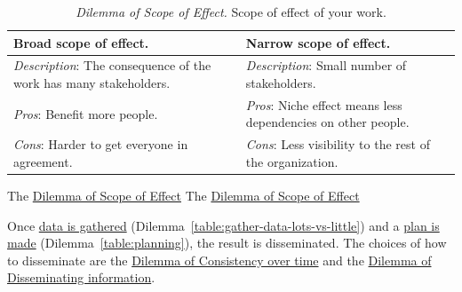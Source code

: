 \begin{center}
\begin{table}[H] %
\begin{tabular}{ | m{\dilemmatablewidth}| m{\dilemmatablewidth} | } 
  \hline
  \textbf{Broad scope of effect.} &
  \textbf{Narrow scope of effect.} \\
  \hline
  \textit{Description}: The consequence of the work has many stakeholders. &
  \textit{Description}: Small number of stakeholders. \\  
  \hline
  \textit{Pros}: Benefit more people. &
  \textit{Pros}: Niche effect means less dependencies on other people. \\
  \hline
  \textit{Cons}: Harder to get everyone in agreement. & 
  \textit{Cons}: Less visibility to the rest of the organization. \\
  \hline
\end{tabular}
\caption{
\textit{Dilemma of Scope of Effect.}
Scope of effect of your work. 
}
\end{table}
\label{table:scope-broad-vs-narrow}
\end{center}

The \href{table:scope-broad-vs-narrow}{Dilemma of Scope of Effect}
The \href{table:scope-broad-vs-narrow}{Dilemma of Scope of Effect}


Once \hyperref[table:gather-data-lots-vs-little]{data is gathered} (Dilemma~\ref{table:gather-data-lots-vs-little}) and a \hyperref[table:planning]{plan is made} (Dilemma~\ref{table:planning}), the result is disseminated. The choices of how to disseminate are the \hyperref[table:consistency]{Dilemma of Consistency over time} and the \hyperref[table:disseminate-one-by-one]{Dilemma of Disseminating information}.

